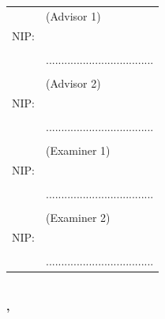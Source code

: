 \noindent
\begin{tabularx}{\textwidth}{X l}
  \advisor{}               & (Advisor 1)                 \\
  NIP: \advisornip{}       &                             \\
                            &  \\
                            & ................................... \\
                            &                             \\
  \coadvisor{}             & (Advisor 2)                 \\
  NIP: \coadvisornip{}     &                             \\
                            &  \\
                            & ................................... \\
                            &                             \\
  \examinerone{}           & (Examiner 1)                \\
  NIP: \examineronenip{}   &                             \\
                            &  \\
                            & ................................... \\
                            &                             \\
  \examinertwo{}           & (Examiner 2)                \\
  NIP: \examinertwonip{}   &                             \\
                            &  \\
                            & ................................... \\
\end{tabularx}
\endgroup

\begin{center}
  \textbf{\MakeUppercase{\place{}}\\\ENGMONTH{}, \the\year{}}
\end{center}
\endgroup
